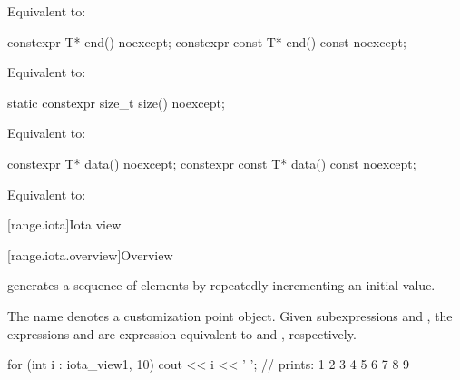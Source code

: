 \begin{itemdescr}
\pnum
\effects
Equivalent to: 
\end{itemdescr}

%
\begin{itemdecl}
constexpr T* end() noexcept;
constexpr const T* end() const noexcept;
\end{itemdecl}

\begin{itemdescr}
\pnum
\effects
Equivalent to: 
\end{itemdescr}

%
\begin{itemdecl}
static constexpr size_t size() noexcept;
\end{itemdecl}

\begin{itemdescr}
\pnum
\effects
Equivalent to: 
\end{itemdescr}

%
\begin{itemdecl}
constexpr T* data() noexcept;
constexpr const T* data() const noexcept;
\end{itemdecl}

\begin{itemdescr}
\pnum
\effects
Equivalent to: 
\end{itemdescr}

[range.iota]{Iota view}

[range.iota.overview]{Overview}

\pnum
{} generates a
sequence of elements by repeatedly incrementing an initial value.

\pnum
The name  denotes a
customization point object.
Given subexpressions  and , the expressions
 and 
are expression-equivalent to
 and , respectively.

\pnum
\begin{example}
\begin{codeblock}
for (int i : iota_view{1, 10})
  cout << i << ' '; // prints: 1 2 3 4 5 6 7 8 9
\end{codeblock}
\end{example}

